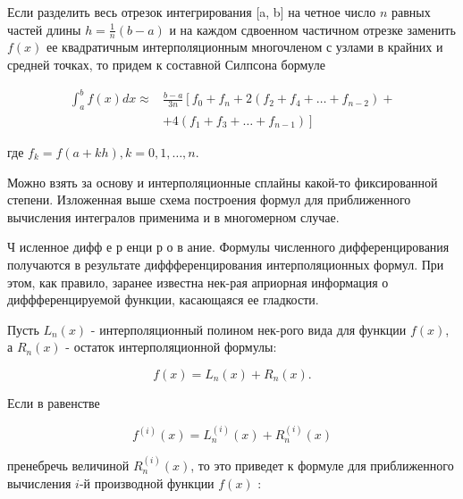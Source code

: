 \documentclass[10pt]{article}
\begin{document}
Если разделить весь отрезок интегрирования [a, b] на четное число $n$ равных частей длины $h=\frac{1}{n}(b-a)$ и на каждом сдвоенном частичном отрезке заменить $f(x)$ ее квадратичным интерполяционным многочленом с узлами в крайних и средней точках, то придем к составной Силпсона бормуле



\[

\begin{aligned}

\int_{a}^{b} f(x) d x \approx & \frac{b-a}{3 n}\left[f_{0}+f_{n}+2\left(f_{2}+f_{4}+\ldots+f_{n-2}\right)+\right. \\

& \left.+4\left(f_{1}+f_{3}+\ldots+f_{n-1}\right)\right]

\end{aligned}

\]



где $f_{k}=f(a+k h), k=0,1, \ldots, n$.



Можно взять за основу и интерполяционные сплайны какой-то фиксированной степени. Изложенная выше схема построения формул для приближенного вычисления интегралов применима и в многомерном случае.



Ч исленное дифф е р енци р о в ание. Формулы численного дифференцирования получаются в результате диффференцирования интерполяционных формул. При этом, как правило, заранее известна нек-рая априорная информация о диффференцируемой функции, касающаяся ее гладкости.



Пусть $L_{n}(x)$ - интерполяционный полином нек-рого вида для функции $f(x)$, а $R_{n}(x)$ - остаток интерполяционной формулы:



\[

f(x)=L_{n}(x)+R_{n}(x) .

\]



Если в равенстве



\[

f^{(i)}(x)=L_{n}^{(i)}(x)+R_{n}^{(i)}(x)

\]



пренебречь величиной $R_{n}^{(i)}(x)$, то это приведет к формуле для приближенного вычисления $i$-й производной функции $f(x)$ :
\end{document}
